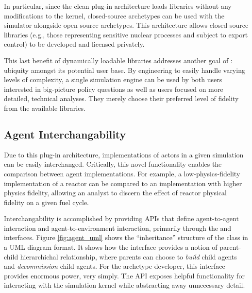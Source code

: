 In particular, since the clean plug-in architecture loads libraries without any
modifications to the \Cyclus kernel, closed-source archetypes can be used with
the simulator alongside open source archetypes. This architecture
allows closed-source libraries (e.g., those representing sensitive nuclear
processes and subject to export control) to be developed and licensed privately.

This last benefit of dynamically loadable libraries addresses
another goal of \Cyclus: ubiquity amongst its potential user base. By
engineering \Cyclus to easily handle varying levels of complexity, a single
simulation engine can be used by both users interested in big-picture policy
questions as well as users focused on more detailed, technical
analyses. They merely choose their preferred level of fidelity from the 
available libraries. 

\subsection{Agent Interchangability}\label{sec:interchangeability}

Due to this plug-in architecture,
implementations of actors in a given simulation can be easily
interchanged. Critically, this novel functionality enables the comparison
between agent implementations. For example, a low-physics-fidelity
implementation of a reactor can be compared to an implementation with higher
physics fidelity, allowing an analyst to discern the effect of reactor physical
fidelity on a given fuel cycle. 

Interchangability is accomplished by providing \glspl{API} that define agent-to-agent
interaction and agent-to-environment interaction, primarily through the
 and  interfaces. Figure \ref{fig:agent_uml} shows 
the ``inheritance'' structure of the  class in a \gls{UML} diagram 
format. It shows how the  interface
provides a notion of parent-child hierarchichal relationship, where parents can
choose to \textit{build} child agents and \textit{decommission} child
agents. For the archetype developer, this interface provides enormous power, 
very simply. The \gls{API} exposes  helpful functionality for 
interacting with the \Cyclus simulation kernel while abstracting away unnecessary 
detail.

